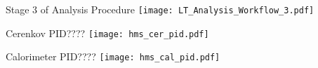 \begin{Mfigure}{Stage 3 of Analysis Procedure}
  \centering
  \texttt{[image: LT\_Analysis\_Workflow\_3.pdf]}
  \caption{Final step of the analysis workfow.}
  \label{fig:3-1_LT_Analysis_Workflow_3}
\end{Mfigure}

%
%

\begin{Mfigure}{Cerenkov PID????}
  \centering
  \texttt{[image: hms\_cer\_pid.pdf]}
  \caption{Plot of HMS cerenkov histogram showing where an appropriate cut is applied.}
  \label{fig:3-3_hms_cer_pid}
\end{Mfigure}

\begin{Mfigure}{Calorimeter PID????}
  \centering
  \texttt{[image: hms\_cal\_pid.pdf]}
  \caption{Plot of HMS calorimeter histogram showing where an appropriate cut is applied.}
  \label{fig:3-3_hms_cal_pid}
\end{Mfigure}


